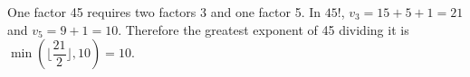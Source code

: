 One factor 45 requires two factors 3 and one factor 5. In $ 45!$, $ v_3=15+5+1=21 $ and $ v_5=9+1=10 $. Therefore the greatest exponent of 45 dividing it is $\min(\lfloor\dfrac{21}{2}\rfloor,10)=\boxed{10}$.
